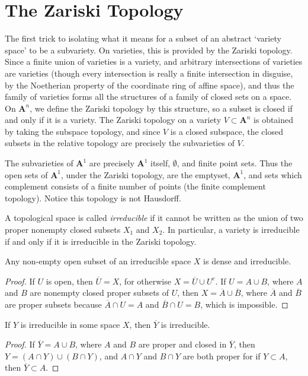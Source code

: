 \section{The Zariski Topology}

The first trick to isolating what it means for a subset of an abstract `variety space' to be a subvariety. On varieties, this is provided by the Zariski topology. Since a finite union of varieties is a variety, and arbitrary intersections of varieties are varieties (though every intersection is really a finite intersection in disguise, by the Noetherian property of the coordinate ring of affine space), and thus the family of varieties forms all the structures of a family of closed sets on a space. On $\mathbf{A}^n$, we define the Zariski topology by this structure, so a subset is closed if and only if it is a variety. The Zariski topology on a variety $V \subset \mathbf{A}^n$ is obtained by taking the subspace topology, and since $V$ is a closed subspace, the closed subsets in the relative topology are precisely the subvarieties of $V$.

\begin{example}
    The subvarieties of $\mathbf{A}^1$ are precisely $\mathbf{A}^1$ itself, $\emptyset$, and finite point sets. Thus the open sets of $\mathbf{A}^1$, under the Zariski topology, are the emptyset, $\mathbf{A}^1$, and sets which complement consists of a finite number of points (the finite complement topology). Notice this topology is not Hausdorff.
\end{example}

A topological space is called \emph{irreducible} if it cannot be written as the union of two proper nonempty closed subsets $X_1$ and $X_2$. In particular, a variety is irreducible if and only if it is irreducible in the Zariski topology.

\begin{theorem}
    Any non-empty open subset of an irreducible space $X$ is dense and irreducible.
\end{theorem}
\begin{proof}
    If $U$ is open, then $\overline{U} = X$, for otherwise $X = \overline{U} \cup U^c$. If $U = A \cup B$, where $A$ and $B$ are nonempty closed proper subsets of $U$, then $X = \overline{A} \cup \overline{B}$, where $\overline{A}$ and $\overline{B}$ are proper subsets because $\overline{A} \cap U = A$ and $\overline{B} \cap U = B$, which is impossible.
\end{proof}

\begin{corollary}
    If $Y$ is irreducible in some space $X$, then $\overline{Y}$ is irreducible.
\end{corollary}
\begin{proof}
    If $\overline{Y} = A \cup B$, where $A$ and $B$ are proper and closed in $\overline{Y}$, then $Y = (A \cap Y) \cup (B \cap Y)$, and $A \cap Y$ and $B \cap Y$ are both proper for if $Y \subset A$, then $\overline{Y} \subset A$.
\end{proof}

